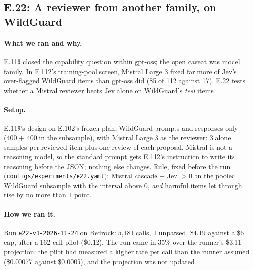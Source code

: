 \documentclass[11pt]{article}
\renewcommand{\_}{\origunderscore\allowbreak}
\begin{document}
\subsection{E.22: A reviewer from another family, on WildGuard}\label{sec:e22}

\paragraph{What we ran and why.}
E.119 closed the capability question within gpt-oss; the open caveat was model family. In E.112's training-pool screen, Mistral Large 3 fixed far more of Jev's over-flagged WildGuard items than gpt-oss did (85 of 112 against 17). E.22 tests whether a Mistral reviewer beats Jev alone on WildGuard's \emph{test} items.

\paragraph{Setup.}
E.119's design on E.102's frozen plan, WildGuard prompts and responses only (400 + 400 in the subsample), with Mistral Large 3 as the reviewer: 3 alone samples per reviewed item plus one review of each proposal. Mistral is not a reasoning model, so the standard prompt gets E.112's instruction to write its reasoning before the JSON; nothing else changes. Rule, fixed before the run (\texttt{configs/experiments/e22.yaml}): Mistral cascade $-$ Jev $> 0$ on the pooled WildGuard subsample with the interval above 0, \emph{and} harmful items let through rise by no more than 1 point.

\paragraph{How we ran it.}
Run \texttt{e22-v1-2026-11-24} on Bedrock: 5{,}181 calls, 1 unparsed, \$4.19 against a \$6 cap, after a 162-call pilot (\$0.12). The run came in 35\% over the runner's \$3.11 projection: the pilot had measured a higher rate per call than the runner assumed (\$0.00077 against \$0.0006), and the projection was not updated.
\end{document}
